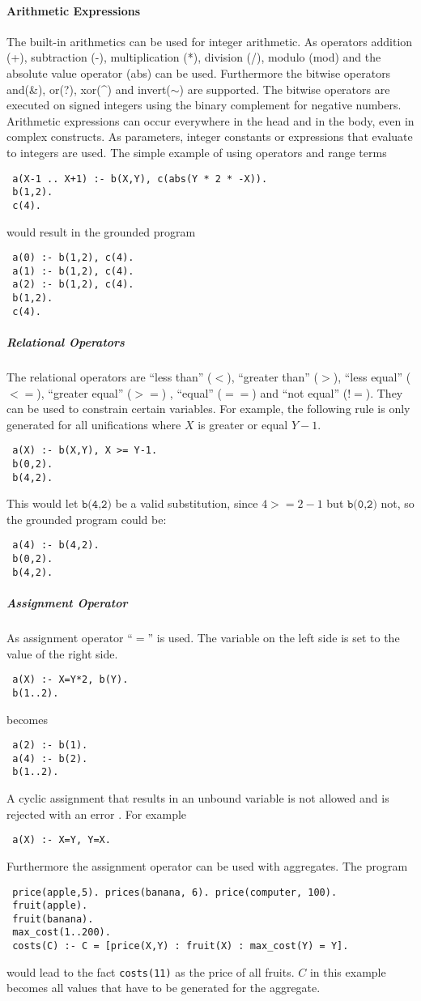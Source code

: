 \documentclass[a4paper,10pt]{article}
\begin{document}
\paragraph{Arithmetic Expressions}
The built-in arithmetics can be used for integer arithmetic.
As operators addition (+), subtraction (-), multiplication (*), division (/), modulo (mod) and the absolute value operator (abs) can be used.
Furthermore the bitwise operators and(\&), or(?), xor(\textasciicircum) and invert($\sim$) are supported. The bitwise operators are executed on signed integers using the binary complement for negative numbers.
Arithmetic expressions can occur everywhere in the head and in the body, even in complex constructs.
As parameters, integer constants or expressions that evaluate to integers are used.
The simple example of using operators and range terms
\begin{verbatim}
 a(X-1 .. X+1) :- b(X,Y), c(abs(Y * 2 * -X)).
 b(1,2).
 c(4).
\end{verbatim}
would result in the grounded program
\begin{verbatim}
 a(0) :- b(1,2), c(4).
 a(1) :- b(1,2), c(4).
 a(2) :- b(1,2), c(4).
 b(1,2).
 c(4).
\end{verbatim}

\subparagraph{Relational Operators}
The relational operators are ``less than'' ($<$), ``greater than'' ($>$), ``less equal'' ($<=$), ``greater equal'' ($>=$) , ``equal'' ($==$) and ``not equal'' ($!=$).
They can be used to constrain certain variables.
For example, the following rule is only generated for all unifications where $X$ is greater or equal $Y-1$.
\begin{verbatim}
 a(X) :- b(X,Y), X >= Y-1.
 b(0,2).
 b(4,2).
\end{verbatim}
This would let $\texttt{b(4,2)}$ be a valid substitution, since $4 >= 2-1$ but $\texttt{b(0,2)}$ not, so the grounded program could be:
\begin{verbatim}
 a(4) :- b(4,2).
 b(0,2).
 b(4,2).
\end{verbatim}

\subparagraph{Assignment Operator}
As assignment operator ``$=$'' is used.
The variable on the left side is set to the value of the right side.
\begin{verbatim}
 a(X) :- X=Y*2, b(Y).
 b(1..2).
\end{verbatim}
becomes
\begin{verbatim}
 a(2) :- b(1).
 a(4) :- b(2).
 b(1..2).
\end{verbatim}
A cyclic assignment that results in an unbound variable is not allowed and is rejected with an error . For example
\begin{verbatim}
 a(X) :- X=Y, Y=X.
\end{verbatim}
Furthermore the assignment operator can be used with aggregates. The program
\begin{verbatim}
 price(apple,5). prices(banana, 6). price(computer, 100).
 fruit(apple).
 fruit(banana).
 max_cost(1..200).
 costs(C) :- C = [price(X,Y) : fruit(X) : max_cost(Y) = Y].
\end{verbatim}
would lead to the fact \texttt{costs(11)} as the price of all fruits.
$C$ in this example becomes all values that have to be generated for the aggregate.
\end{document}
